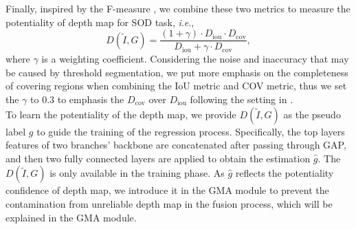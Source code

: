\documentclass[journal]{IEEEtran}
\newcommand{\ie}{\textit{i}.\textit{e}.}
\begin{document}
Finally, inspired by the F-measure \cite{achanta2009frequency}, we combine these two metrics to measure the potentiality of depth map for SOD task, \ie,
\begin{equation}
  D(\tilde{I}, G) = \frac{(1 + \gamma)\cdot D_{\mathrm{iou}} \cdot D_{\mathrm{cov}}}{
  	D_{\mathrm{iou}} + 	\gamma \cdot D_{\mathrm{cov}}}, \label{eq:m3}
\end{equation}
where $\gamma$ is a weighting coefficient. Considering the noise and inaccuracy that may be caused by threshold segmentation, we put more emphasis on the completeness of covering regions when combining the IoU metric and COV metric, thus we set the $\gamma$ to $0.3$ to emphasis the $D_{\mathrm{cov}}$ over $D_{\mathrm{iou}}$ following the setting in \cite{achanta2009frequency}.\\

\indent To learn the potentiality of the depth map, we provide $D({\tilde{I}, G})$ as the pseudo label $g$ to guide the training of the regression process. Specifically, the top layers features of two branches' backbone are concatenated after passing through GAP, and then two fully connected layers are applied to obtain the estimation $\hat{g}$. The $D(\tilde{I}, G)$ is only available in the training phase. As $\hat{g}$ reflects the potentiality confidence of depth map, we introduce it in the GMA module to prevent the contamination from unreliable depth map in the fusion process, which will be explained in the GMA module.
\end{document}
